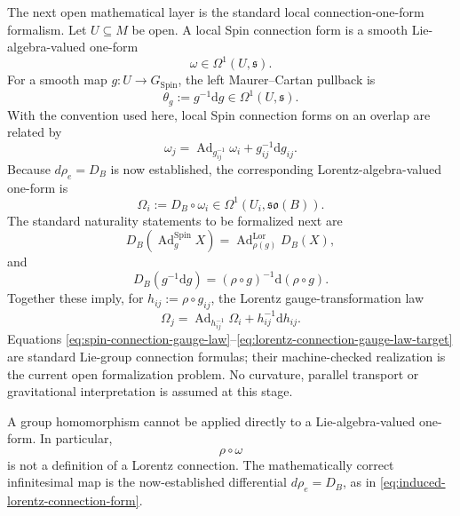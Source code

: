 \documentclass[11pt,a4paper]{article}
\theoremstyle{remark}
\newcommand{\SpinG}{G_{\mathrm{Spin}}}
\newcommand{\soB}{\mathfrak{so}(B)}
\newcommand{\dd}{\mathrm d}
\begin{document}
The next open mathematical layer is the standard local connection-one-form formalism.  Let \(U\subseteq M\) be open.  A local Spin connection form is a smooth Lie-algebra-valued one-form
\begin{equation}
  \omega\in\Omega^1(U,\mathfrak s).
\tag{4.16}
\end{equation}
For a smooth map \(g:U\to\SpinG\), the left Maurer--Cartan pullback is
\begin{equation}
  \theta_g:=g^{-1}\dd g\in\Omega^1(U,\mathfrak s).
\tag{4.17}
\end{equation}
With the convention used here, local Spin connection forms on an overlap are related by
\begin{equation}
  \omega_j
  =\operatorname{Ad}_{g_{ij}^{-1}}\omega_i
  +g_{ij}^{-1}\dd g_{ij}.
\tag{4.18}\label{eq:spin-connection-gauge-law}
\end{equation}
Because \(d\rho_e=D_B\) is now established, the corresponding Lorentz-algebra-valued one-form is
\begin{equation}
  \Omega_i:=D_B\circ\omega_i
  \in\Omega^1(U_i,\soB).
\tag{4.19}\label{eq:induced-lorentz-connection-form}
\end{equation}
The standard naturality statements to be formalized next are
\begin{equation}
  D_B\!\left(\operatorname{Ad}^{\mathrm{Spin}}_{g}X\right)
  =\operatorname{Ad}^{\mathrm{Lor}}_{\rho(g)}D_B(X),
\tag{4.20}\label{eq:adjoint-equivariance-target}
\end{equation}
and
\begin{equation}
  D_B(g^{-1}\dd g)
  =(\rho\circ g)^{-1}\dd(\rho\circ g).
\tag{4.21}\label{eq:maurer-cartan-naturality-target}
\end{equation}
Together these imply, for \(h_{ij}:=\rho\circ g_{ij}\), the Lorentz gauge-transformation law
\begin{equation}
  \Omega_j
  =\operatorname{Ad}_{h_{ij}^{-1}}\Omega_i
  +h_{ij}^{-1}\dd h_{ij}.
\tag{4.22}\label{eq:lorentz-connection-gauge-law-target}
\end{equation}
Equations \eqref{eq:spin-connection-gauge-law}--\eqref{eq:lorentz-connection-gauge-law-target} are standard Lie-group connection formulas; their machine-checked realization is the current open formalization problem.  No curvature, parallel transport or gravitational interpretation is assumed at this stage.

A group homomorphism cannot be applied directly to a Lie-algebra-valued one-form.  In particular,
\begin{equation}
  \rho\circ\omega
\tag{4.23}
\end{equation}
is not a definition of a Lorentz connection.  The mathematically correct infinitesimal map is the now-established differential \(d\rho_e=D_B\), as in \eqref{eq:induced-lorentz-connection-form}.
\end{document}
